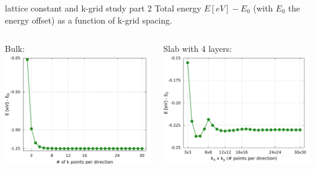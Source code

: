 \begin{frame}{lattice constant and k-grid study part 2}
	\scriptsize{
	Total energy $E [\unit{eV}] - E_0$ (with $E_0$ the energy offset) as a function of k-grid spacing.} \vspace{.1cm}
	\begin{columns}
		\begin{column}{.4\linewidth}
			\scriptsize{
				Bulk: %
			}\\ 
			\includegraphics[width=\linewidth]{andere_bilder/kgrid_bulk.pdf}
		\end{column}
		\begin{column}{.4\linewidth}
			\scriptsize{
				Slab with 4 layers: %
			}\\
			\includegraphics[width=\linewidth]{andere_bilder/kgrid_1x1x4_layers.pdf}

\end{column}
\end{columns}
\end{frame}
